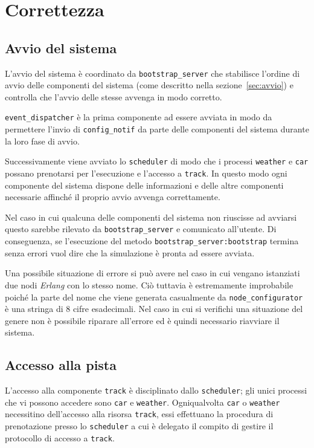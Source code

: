 \documentclass[a4paper]{report}
\newcommand{\Erlang}{\textsl{Erlang}}
\newcommand{\fun}[1]{\texttt{#1}}
\begin{document}
\chapter{Correttezza}
\section{Avvio del sistema}
L'avvio del sistema è coordinato da \texttt{bootstrap\_server} che stabilisce l'ordine di avvio delle componenti del sistema (come descritto nella sezione~\ref{sec:avvio}) e controlla che l'avvio delle stesse avvenga in modo corretto.

\texttt{event\_dispatcher} è la prima componente ad essere avviata in modo da permettere l'invio di \fun{config\_notif} da parte delle componenti del sistema durante la loro fase di avvio.

Successivamente viene avviato lo \texttt{scheduler} di modo che i processi \texttt{weather} e \texttt{car} possano prenotarsi per l'esecuzione e l'accesso a \texttt{track}. In questo modo ogni componente del sistema dispone delle informazioni e delle altre componenti necessarie affinché il proprio avvio avvenga correttamente.

Nel caso in cui qualcuna delle componenti del sistema non riuscisse ad avviarsi questo sarebbe rilevato da \texttt{bootstrap\_server} e comunicato all'utente. Di conseguenza, se l'esecuzione del metodo \fun{bootstrap\_server:bootstrap} termina senza errori vuol dire che la simulazione è pronta ad essere avviata.

Una possibile situazione di errore si può avere nel caso in cui vengano istanziati due nodi \Erlang{} con lo stesso nome. Ciò tuttavia è estremamente improbabile poiché la parte del nome che viene generata casualmente da \texttt{node\_configurator} è una stringa di 8 cifre esadecimali. Nel caso in cui si verifichi una situazione del genere non è possibile riparare all'errore ed è quindi necessario riavviare il sistema.

\section{Accesso alla pista}
L'accesso alla componente \texttt{track} è disciplinato dallo \texttt{scheduler}; gli unici processi che vi possono accedere sono \texttt{car} e \texttt{weather}. Ogniqualvolta \texttt{car} o \texttt{weather} necessitino dell'accesso alla risorsa \texttt{track}, essi effettuano la procedura di prenotazione presso lo \texttt{scheduler} a cui è delegato il compito di gestire il protocollo di accesso a \texttt{track}.
\end{document}
